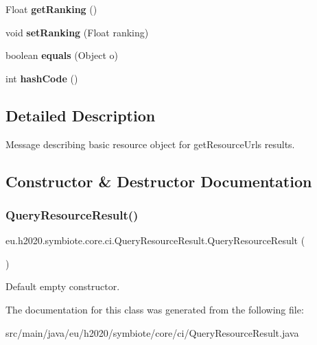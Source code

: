 \begin{DoxyCompactItemize}
Float {\bfseries get\+Ranking} ()
\item 
\mbox{\label{classeu_1_1h2020_1_1symbiote_1_1core_1_1ci_1_1QueryResourceResult_a4e8e306af6f1008e7f7a4e946f6fef5c}} 
void {\bfseries set\+Ranking} (Float ranking)
\item 
\mbox{\label{classeu_1_1h2020_1_1symbiote_1_1core_1_1ci_1_1QueryResourceResult_a9823f566b597fb167b0d959dc793996f}} 
boolean {\bfseries equals} (Object o)
\item 
\mbox{\label{classeu_1_1h2020_1_1symbiote_1_1core_1_1ci_1_1QueryResourceResult_a56f3c7f5cb3b1b9003426ddef6117396}} 
int {\bfseries hash\+Code} ()
\end{DoxyCompactItemize}


\subsection{Detailed Description}
Message describing basic resource object for get\+Resource\+Urls results. 

\subsection{Constructor \& Destructor Documentation}
\mbox{\label{classeu_1_1h2020_1_1symbiote_1_1core_1_1ci_1_1QueryResourceResult_a411d2e98b86a317baf2b1c256ea9a7c9}} 
\subsubsection{\texorpdfstring{Query\+Resource\+Result()}{QueryResourceResult()}}
{\footnotesize\ttfamily eu.\+h2020.\+symbiote.\+core.\+ci.\+Query\+Resource\+Result.\+Query\+Resource\+Result (\begin{DoxyParamCaption}{ }\end{DoxyParamCaption})}

Default empty constructor. 

The documentation for this class was generated from the following file\+:\begin{DoxyCompactItemize}
\item 
src/main/java/eu/h2020/symbiote/core/ci/Query\+Resource\+Result.\+java\end{DoxyCompactItemize}
